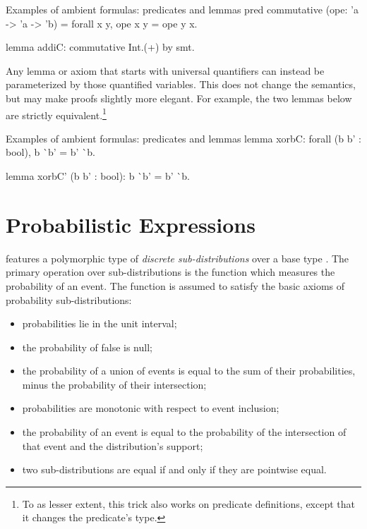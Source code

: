 \begin{easycrypt}[label={lst:formulas}]{Examples of ambient formulas: predicates and lemmas}
pred commutative (ope: 'a -> 'a -> 'b) =
  forall x y, ope x y = ope y x.

lemma addiC: commutative Int.(+) by smt.
\end{easycrypt}

Any lemma or axiom that starts with universal quantifiers can instead be
parameterized by those quantified variables. This does not change the semantics,
but may make proofs slightly more elegant. For example, the two lemmas below
are strictly equivalent.\footnote{To as lesser extent, this trick also works on
predicate definitions, except that it changes the predicate's type.}
\begin{easycrypt}[label={lst:formulas}]{Examples of ambient formulas: predicates and lemmas}
lemma xorbC: forall (b b' : bool), b ^^ b' = b' ^^ b.

lemma xorbC' (b b' : bool): b ^^ b' = b' ^^ b.
\end{easycrypt}

\section{Probabilistic Expressions\label{sec:distributions}}

\EasyCrypt features a polymorphic type  of \emph{discrete
sub-distributions} over a base type . The primary operation over
sub-distributions is the function  which measures the probability of an event. The function is assumed to
satisfy the basic axioms of probability sub-distributions:
\begin{itemize}\itemsep-.5em
\item probabilities lie in the unit interval;
\item the probability of false is null;
\item the probability of a union of events is equal to the sum of
  their probabilities, minus the probability of their intersection;
\item probabilities are monotonic with respect to event inclusion;
\item the probability of an event is equal to the probability of the
  intersection of that event and the distribution's support;
\item two sub-distributions are equal if and only if they are pointwise equal.
\end{itemize}

